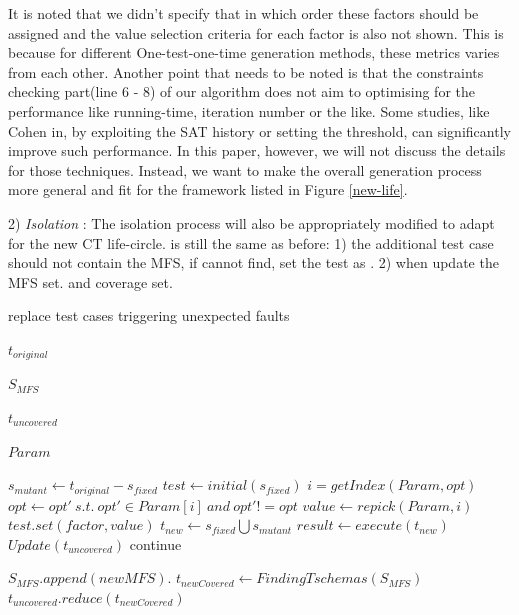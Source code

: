 \documentclass{sig-alternate}
\begin{document}
It is noted that we didn't specify that in which order these factors should be assigned and the value selection criteria for each factor is also not shown. This is because for different One-test-one-time generation methods, these metrics varies from each other. Another point that needs to be noted is that the constraints checking part(line 6 - 8) of our algorithm does not aim to optimising for the performance like running-time, iteration number or the like. Some studies, like Cohen in, by exploiting the SAT history or setting the threshold, can significantly improve such performance. In this paper, however, we will not discuss the details for those techniques. Instead, we want to make the overall generation process more general and fit for the framework listed in Figure \ref{new-life}.


2) \emph{Isolation} :
The isolation process will also be appropriately modified to adapt for the new CT life-circle. is still the same as before: 1) the additional test case should not contain the MFS, if cannot find, set the test as . 2) when update the MFS set. and coverage set.

\begin{algorithm}
  \caption{replace test cases triggering unexpected faults}
  \begin{algorithmic}[1]
     \Require

     $t_{original}$ 

     $S_{MFS}$ 

    $t_{uncovered}$ 

     $Param$ 




       \State $s_{mutant} \leftarrow t_{original} - s_{fixed}$
       \State $test \leftarrow initial(s_{fixed})$
          \State $i = getIndex(Param,opt) $
          \State $opt \leftarrow opt' \ s.t.\ opt' \in Param[i]\ and\ opt' != opt$
              \State $value \leftarrow repick(Param,i) $
           \EndWhile
           \State $test.set(factor, value)$
       \EndFor
       \State $t_{new} \leftarrow s_{fixed} \bigcup s_{mutant} $
       \State $result \leftarrow execute(t_{new})$
         \State  $Update(t_{uncovered})$
       \Else
         \State continue
       \EndIf
     \EndWhile

     \State $S_{MFS}.append(newMFS)$.
     \State $t_{newCovered} \leftarrow FindingTschemas(S_{MFS})$
     \State $t_{uncovered}.reduce(t_{newCovered})$
  \end{algorithmic}
\end{algorithm}
\end{document}
